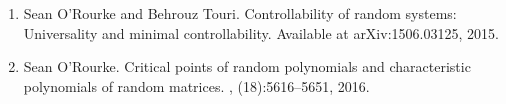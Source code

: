 \documentclass[letterpaper]{article}
\begin{document}
\begin{enumerate}
	\item Sean O'Rourke and Behrouz Touri.
	\newblock Controllability of random systems: Universality and minimal controllability.
	\newblock Available at  arXiv:1506.03125, 2015.  
	\item Sean O'Rourke.
	\newblock Critical points of random polynomials and characteristic polynomials of random matrices.
	, (18):5616--5651, 2016.


\end{enumerate}
\end{document}
